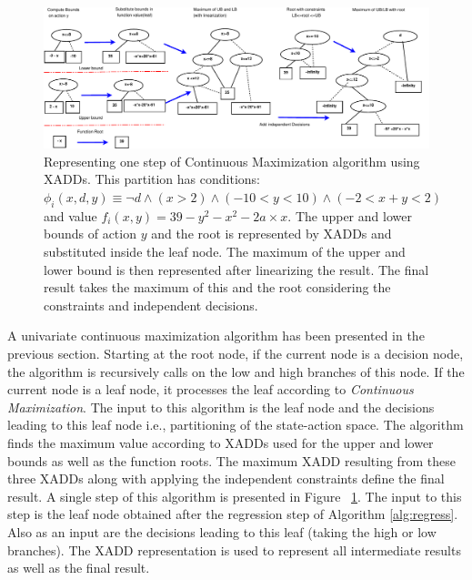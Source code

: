 \documentclass[twoside,11pt]{article}
\begin{document}
\vspace{10mm}
\begin{figure}[t!]
\includegraphics[width=0.97 \textwidth]{Figures2/diagrams/maximum_cont_action3.pdf}

\caption{\footnotesize Representing one step of Continuous Maximization algorithm using XADDs. This partition has conditions: 
$\phi_i ( x,d,y ) \equiv \neg d \wedge ( x>2 ) \wedge ( -10 < y < 10) \wedge ( -2 < x+y < 2 )$  
and value $f_i ( x,y ) = 39- y^2 -x^2 - 2a \times x$. The upper and lower bounds of action $y$ and the root is represented by XADDs and substituted inside the leaf node. The maximum of the upper and lower bound is then represented after linearizing the result. The final result takes the maximum of this and the root considering the constraints and independent decisions.}
\label{fig:xadd_max}
\vspace{-8mm}
\end{figure}
\vspace{-6mm}

A univariate continuous maximization algorithm has been presented in the previous section. 
Starting at the root node, if the current node is a decision node, the algorithm is recursively calls on the low and high branches of this node. If the current node is a leaf node, it processes the leaf according to \emph{Continuous Maximization}. The input to this algorithm is the leaf node and the decisions leading to this leaf node i.e., partitioning of the state-action space. The algorithm finds the maximum value according to XADDs used for the upper and lower bounds as well as the function roots. The maximum XADD resulting from these three XADDs along with applying the independent constraints define the final result. A single step of this algorithm is presented in Figure ~\ref{fig:xadd_max}. The input to this step is the leaf node obtained after the regression step of Algorithm \ref{alg:regress}. Also as an input are the decisions leading to this leaf (taking the high or low branches).  The XADD representation is used to represent all intermediate results as well as the final result. 
\end{document}
